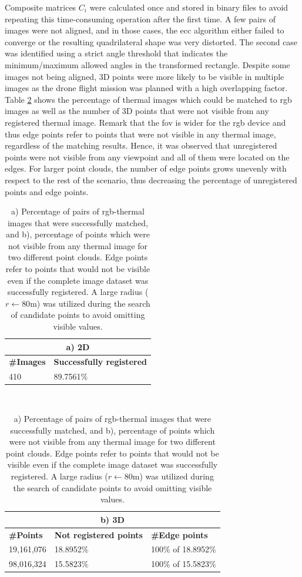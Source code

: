 Composite matrices $C_i$ were calculated once and stored in binary files to avoid repeating this time-consuming operation after the first time. A few pairs of images were not aligned, and in those cases, the \acrshort{ecc} algorithm either failed to converge or the resulting quadrilateral shape was very distorted. The second case was identified using a strict angle threshold that indicates the minimum/maximum allowed angles in the transformed rectangle. Despite some images not being aligned, 3D points were more likely to be visible in multiple images as the drone flight mission was planned with a high overlapping factor. Table \ref{table:image_registration_statistics} shows the percentage of thermal images which could be matched to \acrshort{rgb} images as well as the number of 3D points that were not visible from any registered thermal image. Remark that the \acrshort{fov} is wider for the \acrshort{rgb} device and thus edge points refer to points that were not visible in any thermal image, regardless of the matching results. Hence, it was observed that unregistered points were not visible from any viewpoint and all of them were located on the edges. For larger point clouds, the number of edge points grows unevenly with respect to the rest of the scenario, thus decreasing the percentage of unregistered points and edge points.

\begin{table}
    \sffamily
    \caption{a) Percentage of pairs of \acrshort{rgb}-thermal images that were successfully matched, and b), percentage of points which were not visible from any thermal image for two different point clouds. Edge points refer to points that would not be visible even if the complete image dataset was successfully registered. A large radius ($r \gets 80$\si{\meter}) was utilized during the search of candidate points to avoid omitting visible values.}
    \label{table:image_registration_statistics}
    \begin{tabular}{l@{\hskip 0.3in}l@{}}
        \multicolumn{2}{c}{a) 2D}\\
        \midrule
        \textbf{\#Images} & \textbf{Successfully registered}\\
        \midrule
        410 & 89.7561\% \\
        \bottomrule
    \end{tabular}\\[2mm]
    \begin{tabular}{l@{\hskip 0.3in}l@{\hskip 0.3in}l@{}}
        \multicolumn{3}{c}{b) 3D}\\
        \midrule
        \textbf{\#Points} & \textbf{Not registered points} & \textbf{\#Edge points}\\
        \midrule
        19,161,076 & 18.8952\% & 100\% of 18.8952\%\\
        98,016,324 & 15.5823\% & 100\% of 15.5823\%\\
        \bottomrule
    \end{tabular}
\end{table}


